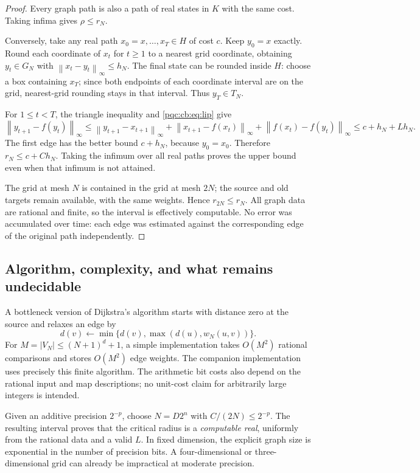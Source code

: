 \documentclass[11pt,letterpaper]{article}
\numberwithin{equation}{section}
\theoremstyle{definition}
\theoremstyle{remark}
\newcommand{\norm}[1]{\left\lVert #1\right\rVert_{\infty}}
\begin{document}
\begin{proof}
Every graph path is also a path of real states in $K$ with the same cost.
Taking infima gives $\rho\le r_N$.

Conversely, take any real path $x_0=x,\ldots,x_T\in H$ of cost $c$.
Keep $y_0=x$ exactly.  Round each coordinate of $x_t$ for $t\ge1$ to a nearest
grid coordinate, obtaining $y_t\in G_N$ with
$\norm{x_t-y_t}\le h_N$.  The final state can be rounded inside $H$:
choose a box containing $x_T$; since both endpoints of each coordinate
interval are on the grid, nearest-grid rounding stays in that interval.
Thus $y_T\in T_N$.

For $1\le t<T$, the triangle inequality and \eqref{pqc:cb:eq:lip} give
\[
 \norm{y_{t+1}-f(y_t)}
 \le \norm{y_{t+1}-x_{t+1}}
      +\norm{x_{t+1}-f(x_t)}
      +\norm{f(x_t)-f(y_t)}
 \le c+h_N+Lh_N.
\]
The first edge has the better bound $c+h_N$, because $y_0=x_0$.
Therefore $r_N\le c+Ch_N$.  Taking the infimum over all real paths proves the
upper bound even when that infimum is not attained.

The grid at mesh $N$ is contained in the grid at mesh $2N$; the source and old
targets remain available, with the same weights.  Hence $r_{2N}\le r_N$.
All graph data are rational and finite, so the interval is effectively
computable.  No error was accumulated over time: each edge was estimated
against the corresponding edge of the original path independently.
\end{proof}

\subsection{Algorithm, complexity, and what remains undecidable}

A bottleneck version of Dijkstra's algorithm starts with distance zero at the
source and relaxes an edge by
\[
 d(v)\leftarrow\min\{d(v),\max(d(u),w_N(u,v))\}.
\]
For $M=|V_N|\le(N+1)^d+1$, a simple implementation takes $O(M^2)$ rational
comparisons and stores $O(M^2)$ edge weights.  The companion implementation
uses precisely this finite algorithm.  The arithmetic bit costs also depend
on the rational input and map descriptions; no unit-cost claim for arbitrarily
large integers is intended.

Given an additive precision $2^{-p}$, choose $N=D2^n$ with
$C/(2N)\le2^{-p}$.  The resulting interval proves that the critical radius is a
\emph{computable real}, uniformly from the rational data and a valid $L$.
In fixed dimension, the explicit graph size is exponential in the number of
precision bits.  A four-dimensional or three-dimensional grid can already
be impractical at moderate precision.
\end{document}
